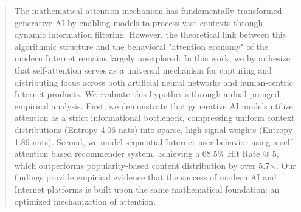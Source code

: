 \begin{abstract}
The mathematical attention mechanism has fundamentally transformed generative AI by enabling models to process vast contexts through dynamic information filtering. However, the theoretical link between this algorithmic structure and the behavioral "attention economy" of the modern Internet remains largely unexplored. In this work, we hypothesize that self-attention serves as a universal mechanism for capturing and distributing focus across both artificial neural networks and human-centric Internet products. We evaluate this hypothesis through a dual-pronged empirical analysis. First, we demonstrate that generative AI models utilize attention as a strict informational bottleneck, compressing uniform context distributions (Entropy 4.06 nats) into sparse, high-signal weights (Entropy 1.89 nats). Second, we model sequential Internet user behavior using a self-attention based recommender system, achieving a 68.5\% Hit Rate @ 5, which outperforms popularity-based content distribution by over 5.7$\times$. Our findings provide empirical evidence that the success of modern AI and Internet platforms is built upon the same mathematical foundation: an optimized mechanization of attention.
\end{abstract}
